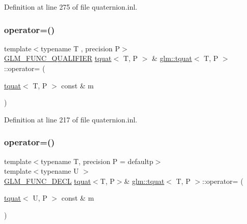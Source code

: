 Definition at line 275 of file quaternion.\+inl.

\mbox{\label{structglm_1_1tquat_a19b252f704a5d0cb43df15cd3a8b545e}} 
\subsubsection{\texorpdfstring{operator=()}{operator=()}\hspace{0.1cm}{\footnotesize\ttfamily [1/3]}}
{\footnotesize\ttfamily template$<$typename T , precision P$>$ \\
\mbox{\hyperlink{setup_8hpp_a33fdea6f91c5f834105f7415e2a64407}{G\+L\+M\+\_\+\+F\+U\+N\+C\+\_\+\+Q\+U\+A\+L\+I\+F\+I\+ER}} \mbox{\hyperlink{structglm_1_1tquat}{tquat}}$<$ T, P $>$ \& \mbox{\hyperlink{structglm_1_1tquat}{glm\+::tquat}}$<$ T, P $>$\+::operator= (\begin{DoxyParamCaption}\item[{\mbox{\hyperlink{structglm_1_1tquat}{tquat}}$<$ T, P $>$ const \&}]{m }\end{DoxyParamCaption})}



Definition at line 217 of file quaternion.\+inl.

\mbox{\label{structglm_1_1tquat_af00985afe704157487281c4c3eb4f790}} 
\subsubsection{\texorpdfstring{operator=()}{operator=()}\hspace{0.1cm}{\footnotesize\ttfamily [2/3]}}
{\footnotesize\ttfamily template$<$typename T, precision P = defaultp$>$ \\
template$<$typename U $>$ \\
\mbox{\hyperlink{setup_8hpp_ab2d052de21a70539923e9bcbf6e83a51}{G\+L\+M\+\_\+\+F\+U\+N\+C\+\_\+\+D\+E\+CL}} \mbox{\hyperlink{structglm_1_1tquat}{tquat}}$<$T, P$>$\& \mbox{\hyperlink{structglm_1_1tquat}{glm\+::tquat}}$<$ T, P $>$\+::operator= (\begin{DoxyParamCaption}\item[{\mbox{\hyperlink{structglm_1_1tquat}{tquat}}$<$ U, P $>$ const \&}]{m }\end{DoxyParamCaption})}


